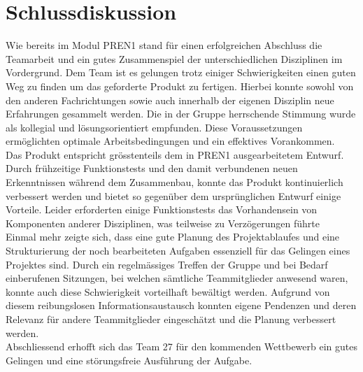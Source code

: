 \section{Schlussdiskussion}

Wie bereits im Modul PREN1 stand für einen erfolgreichen Abschluss die Teamarbeit und ein gutes Zusammenspiel der unterschiedlichen Disziplinen im Vordergrund. Dem Team ist es gelungen trotz einiger Schwierigkeiten einen guten Weg zu finden um das geforderte Produkt zu fertigen. Hierbei konnte sowohl von den anderen Fachrichtungen sowie auch innerhalb der eigenen Disziplin neue Erfahrungen gesammelt werden. Die in der Gruppe herrschende Stimmung wurde als kollegial und lösungsorientiert empfunden. Diese Voraussetzungen ermöglichten optimale Arbeitsbedingungen und ein effektives Vorankommen.\\

Das Produkt entspricht grösstenteils  dem in PREN1 ausgearbeitetem Entwurf. Durch frühzeitige Funktionstests und den damit verbundenen neuen Erkenntnissen während dem Zusammenbau, konnte das Produkt kontinuierlich verbessert werden und bietet so gegenüber dem ursprünglichen Entwurf einige Vorteile. Leider erforderten einige Funktionstests das Vorhandensein von Komponenten anderer Disziplinen, was teilweise zu Verzögerungen führte\\

Einmal mehr zeigte sich, dass eine gute Planung des Projektablaufes und eine Strukturierung der noch bearbeiteten Aufgaben essenziell für das Gelingen eines Projektes sind. Durch ein regelmässiges Treffen der Gruppe und bei Bedarf einberufenen Sitzungen, bei welchen sämtliche Teammitglieder anwesend waren, konnte auch diese Schwierigkeit vorteilhaft bewältigt werden. Aufgrund von diesem reibungslosen Informationsaustausch konnten eigene Pendenzen und deren Relevanz für andere Teammitglieder eingeschätzt und die Planung verbessert werden.\\

Abschliessend erhofft sich das Team 27 für den kommenden Wettbewerb ein gutes Gelingen und eine störungsfreie Ausführung der Aufgabe.\\